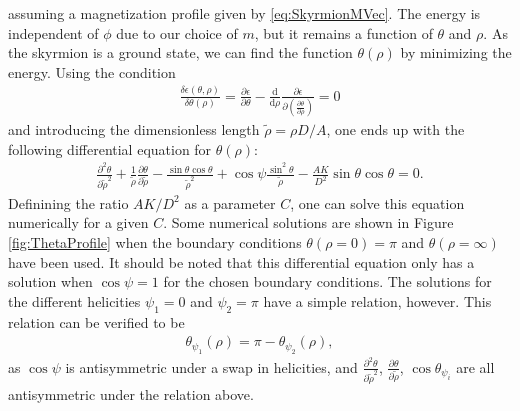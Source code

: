 assuming a magnetization profile given by \eqref{eq:SkyrmionMVec}. The energy is independent of $\phi$ due to our choice of $m$, but it remains a function of $\theta$ and $\rho$. As the skyrmion is a ground state, we can find the function $\theta(\rho)$ by minimizing the energy. Using the condition
\begin{align}
\frac{\delta\epsilon(\theta, \rho)}{\delta\theta(\rho)} = \frac{\partial\epsilon}{\partial\theta} - \frac{\textrm{d}}{\textrm{d}\rho} \frac{\partial\epsilon}{\partial (\frac{\partial\theta}{\partial \rho})} = 0
\end{align}
and introducing the dimensionless length $\tilde{\rho} = \rho D/A$, one ends up with the following differential equation for $\theta(\rho)$:
\begin{align}
\label{eq:ODEtheta}
\frac{\partial^2\theta}{\partial\tilde{\rho}^2} + \frac{1}{\tilde{\rho}}\frac{\partial\theta}{\partial\tilde{\rho}} - \frac{\sin\theta\cos\theta}{\tilde{\rho}^2}+\cos\psi\frac{\sin^2\theta}{\tilde{\rho}}-\frac{AK}{D^2}\sin\theta\cos\theta = 0.
\end{align}
Definining the ratio $AK/D^2$ as a parameter $C$, one can solve this equation numerically for a given $C$. Some numerical solutions are shown in Figure \ref{fig:ThetaProfile} when the boundary conditions $\theta(\rho = 0) = \pi$ and $\theta(\rho = \infty)$ have been used. It should be noted that this differential equation only has a solution when $\cos\psi = 1$ for the chosen boundary conditions. The solutions for the different helicities $\psi_1 = 0$ and $\psi_2 = \pi$ have a simple relation, however. This relation can be verified to be
\begin{align}
\label{eq:ThetaHelicityRelation}
\theta_{\psi_1}(\rho) = \pi - \theta_{\psi_2}(\rho),
\end{align}
as $\cos\psi$ is antisymmetric under a swap in helicities, and $\frac{\partial^2\theta}{\partial\tilde{\rho}^2}$, $\frac{\partial\theta}{\partial\tilde{\rho}}$, $\cos\theta_{\psi_i}$ are all antisymmetric under the relation above.
